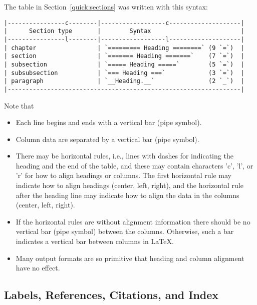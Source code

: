 \documentclass[%
oneside,                 %
final,                   %
10pt]{article}
\begin{document}
The table in Section~\ref{quick:sections} was written with this
syntax:
\begin{Verbatim}[numbers=none,fontsize=\fontsize{9pt}{9pt},baselinestretch=0.85,xleftmargin=0mm]
|----------------c--------|------------------c--------------------|
|      Section type       |        Syntax                         |
|----------------l--------|------------------l--------------------|
| chapter                 | `========= Heading ========` (9 `=`)  |
| section                 | `======= Heading =======`    (7 `=`)  |
| subsection              | `===== Heading =====`        (5 `=`)  |
| subsubsection           | `=== Heading ===`            (3 `=`)  |
| paragraph               | `__Heading.__`               (2 `_`)  |
|-----------------------------------------------------------------|
\end{Verbatim}

Note that

\begin{itemize}
 \item Each line begins and ends with a vertical bar (pipe symbol).

 \item Column data are separated by a vertical bar (pipe symbol).

 \item There may be horizontal rules, i.e., lines with dashes for
   indicating the heading and the end of the table, and these may
   contain characters 'c', 'l', or 'r' for how to align headings or
   columns. The first horizontal rule may indicate how to align
   headings (center, left, right), and the horizontal rule after the
   heading line may indicate how to align the data in the columns
   (center, left, right).

 \item If the horizontal rules are without alignment information there should
   be no vertical bar (pipe symbol) between the columns. Otherwise, such
   a bar indicates a vertical bar between columns in {\LaTeX}.

 \item Many output formats are so primitive that heading and column alignment
   have no effect.
\end{itemize}

\noindent

\subsection{Labels, References, Citations, and Index}
\end{document}
